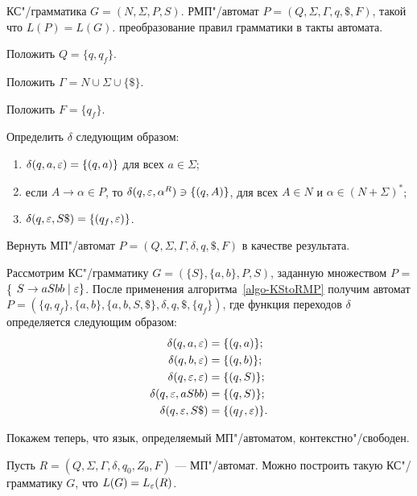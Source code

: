 {\label{algo-KStoRMP} КС"/грамматика $G = (N, \Sigma, P, S)$. }
{РМП"/автомат $P = (Q, \Sigma, \Gamma, q, \mathdollar, F)$, такой что $L(P) = L(G).$}
{преобразование правил грамматики в такты автомата.}
{
\item Положить $Q = \{ q, q_f \}$.

\item Положить $\Gamma = N \cup \Sigma \cup \{ \mathdollar \}$.
\item Положить $F = \{ q_f \}$. 

\item Определить $\delta$ следующим образом:
	\begin{enumerate}
		\item $\delta(q, a, \varepsilon) = \{ (q, a) \}$ для всех $a \in \Sigma$;
		\item если $A \to \alpha \in P$, то $\delta(q, \varepsilon, \alpha^R) \ni \{ (q, A) \}$, для всех $A \in N$ и $\alpha \in (N + \Sigma)^*$;
		\item $\delta(q, \varepsilon, S\mathdollar) = \{ (q_f, \varepsilon) \}$.
  \end{enumerate}  

\item Вернуть МП"/автомат $P = (Q, \Sigma, \Gamma, \delta, q, \mathdollar, F)$ в качестве результата.
}

\begin{myexample}
Рассмотрим КС"/грамматику $G = (\{S\}, \{a, b\}, P, S)$, заданную множеством $P$ = \{ $S \to aSbb \mid \varepsilon \}$.
После применения алгоритма~\ref{algo-KStoRMP} получим автомат $P = (\{q, q_f\},  \{a, b\}, \{a, b, S, \mathdollar\}, \delta, q, \mathdollar, \{q_f\})$, где функция переходов $\delta$ определяется следующим образом:
\begin{align*}
    \delta(q, a, \varepsilon) 	&= \{ (q, a) \}; \\
    \delta(q, b, \varepsilon) 	&= \{ (q, b) \}; \\
    \delta(q, \varepsilon, \varepsilon) 		&= \{ (q, S) \}; \\
    \delta(q, \varepsilon, aSbb) 		&= \{ (q, S) \}; \\
    \delta(q, \varepsilon, S\mathdollar) 		&= \{ (q_f, \varepsilon) \}. \\
\end{align*}
\end{myexample}

Покажем теперь, что язык, определяемый МП"/автоматом, контекстно"/свободен.

\begin{mytheorem}
\label{pda2cfg}
Пусть $R=(Q,\Sigma,\Gamma,\delta,q_0,Z_0,F)$ --- МП"/автомат. Можно построить такую КС"/грамматику $G$, что $L(G)=L_\varepsilon(R)$.
\end{mytheorem}

